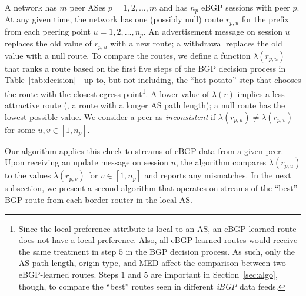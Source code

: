 A network has $m$ peer ASes $p=1,2, \ldots, m$ and has $n_p$ eBGP
sessions with peer $p$.  At any given time, the network has one
(possibly null) route $r_{p,u}$ for the prefix from each peering point
$u=1,2,\ldots,n_p$.  An advertisement message on session $u$ replaces
the old value of $r_{p,u}$ with a new route; a withdrawal replaces the
old value with a null route.  To compare the routes, we define a
function $\lambda(r_{p,u})$ that ranks a route based on the first five
steps of the BGP decision process in Table~\ref{tab:decision}---up to,
but not including, the ``hot potato'' step that chooses the route with
the closest egress point\footnote{Since the local-preference attribute
is local to an AS, an eBGP-learned route does not have a local
preference.  Also, all eBGP-learned routes would receive the same
treatment in step $5$ in the BGP decision process.  As such, only the
AS path length, origin type, and MED affect the comparison between two
eBGP-learned routes.  Steps $1$ and $5$ are important in
Section~\ref{sec:algo}, though, to compare the ``best'' routes seen in
different {\em iBGP\/} data feeds.}.  A lower value of $\lambda(r)$
implies a less attractive route (\eg, a route with a longer AS path
length); a null route has the lowest possible value.  We consider a
peer as {\em inconsistent\/} if $\lambda(r_{p,u}) \neq
\lambda(r_{p,v})$ for some $u,v\in [1,n_p]$.

Our algorithm applies this check to streams of eBGP data from a given
peer.  Upon receiving an update message on session $u$, the algorithm
compares $\lambda(r_{p,u})$ to the values $\lambda(r_{p,v})$ for $v\in
[1,n_p]$ and reports any mismatches.  In the next subsection, we present
a second algorithm that operates on streams of the ``best'' BGP route
from each border router in the local AS.
